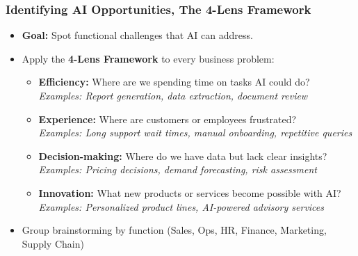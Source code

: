 \begin{frame}[fragile]\frametitle{Identifying AI Opportunities, The 4-Lens Framework}

\begin{itemize}
  \item \textbf{Goal:} Spot functional challenges that AI can address.
  \item Apply the \textbf{4-Lens Framework} to every business problem:
    \begin{itemize}
      \item \textbf{Efficiency:} Where are we spending time on tasks AI could do?\\
        \textit{Examples: Report generation, data extraction, document review}
      \item \textbf{Experience:} Where are customers or employees frustrated?\\
        \textit{Examples: Long support wait times, manual onboarding, repetitive queries}
      \item \textbf{Decision-making:} Where do we have data but lack clear insights?\\
        \textit{Examples: Pricing decisions, demand forecasting, risk assessment}
      \item \textbf{Innovation:} What new products or services become possible with AI?\\
        \textit{Examples: Personalized product lines, AI-powered advisory services}
    \end{itemize}
  \item Group brainstorming by function (Sales, Ops, HR, Finance, Marketing, Supply Chain)
\end{itemize}

\end{frame}

